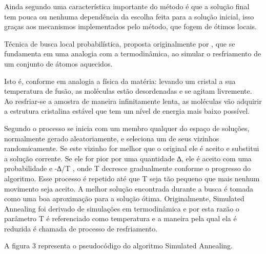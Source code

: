 Ainda segundo \cite{armentanointroduccao} uma característica importante do método é que a solução final tem pouca ou nenhuma dependência da escolha feita para a solução inicial, isso graças aos mecanismos implementados pelo método, que fogem de ótimos locais.


Técnica de busca local probabilística, proposta originalmente por \cite{kirkpatrick1983optimization}, que se fundamenta em uma analogia com a termodinâmica, ao simular o 
resfriamento de um conjunto de átomos aquecidos.\par 

Isto é, conforme \cite{noronha2003abordagem} em analogia a física da matéria: levando um cristal a sua temperatura de fusão, as moléculas estão desordenadas e se agitam livremente. Ao resfriar-se a amostra de maneira infinitamente lenta, as moléculas vão adquirir a estrutura cristalina estável que tem um nível de energia mais baixo possível.\par 

Segundo \cite{souza2002experiencias} o processo se inicia com um membro qualquer do espaço de soluções, normalmente gerado aleatoriamente, e seleciona um de seus vizinhos randomicamente. Se este vizinho for melhor que o original ele é aceito e substitui a solução corrente. Se ele for pior por uma quantidade ∆, ele é aceito com uma probabilidade e -∆/T , onde T decresce gradualmente conforme o progresso do algoritmo. Esse processo é repetido até que T seja tão pequeno que mais nenhum movimento seja aceito. A melhor solução encontrada durante a busca é tomada como uma boa aproximação para a solução ótima. Originalmente, Simulated Annealing foi derivado de simulações em termodinâmica e por esta razão o parâmetro T é referenciado como temperatura e a maneira pela qual ela é reduzida é chamada de processo de resfriamento.


A figura 3 representa o pseudocódigo do algoritmo Simulated Annealing.


